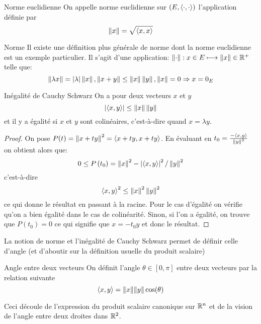\documentclass{classe}
\begin{document}
\begin{définition}{Norme euclidienne}{}
	On appelle norme euclidienne sur $(E, \left\langle \cdot, \cdot \right\rangle)$ l'application définie par
\begin{equation*}
	\left\lVert x \right\rVert = \sqrt{\left\langle x, x \right\rangle}
\end{equation*}
\end{définition}

\begin{remarque}{Norme}{}
	Il existe une définition plus générale de norme dont la norme euclidienne est un exemple particulier.
	Il s'agit d'une application: $\left\lVert \cdot \right\rVert: x \in E \longmapsto \left\lVert x \right\rVert \in \mathbb{R}^{+}$ telle que:
	\begin{equation*}
		\left\lVert \lambda x \right\rVert = \left|\lambda\right|\left\lVert x \right\rVert, \left\lVert x + y \right\rVert\leq \left\lVert x \right\rVert\left\lVert y \right\rVert, \left\lVert x \right\rVert = 0 \Rightarrow x = 0_{E}
	\end{equation*}
\end{remarque}

\begin{théorème}{Inégalité de Cauchy Schwarz}{}
On a pour deux vecteurs $x$ et $y$
\begin{equation*}
	\left|\left\langle x, y \right\rangle\right| \leq \left\lVert x \right\rVert\left\lVert y \right\rVert
\end{equation*}
et il y a égalité si $x$ et $y$ sont colinéaires, c'est-à-dire quand $x = \lambda y$.
\end{théorème}
\begin{proof}
	On pose $P(t) = \left\lVert x + ty \right\rVert^{2} = \left\langle x + ty, x + ty \right\rangle$. En évaluant en $t_{0} = \frac{-\left\langle x, y \right\rangle}{\left\lVert y \right\rVert^{2}}$ on obtient alors que:
	\begin{equation*}
		0 \leq P\left( t_{0} \right) = \left\lVert x \right\rVert^{2} - \left|\left\langle x, y \right\rangle\right|^{2}/\left\lVert y \right\rVert^{2}
	\end{equation*}
	c'est-à-dire
	\begin{equation*}
		\left\langle x, y \right\rangle^{2} \leq \left\lVert x \right\rVert^{2}\left\lVert y \right\rVert^{2}
	\end{equation*}
	ce qui donne le résultat en passant à la racine.
	Pour le cas d'égalité on vérifie qu'on a bien égalité dans le cas de colinéarité. Sinon, si l'on a égalité, on trouve que $P(t_{0}) = 0$ ce qui signifie que $x = -t_{0}y$ et donc le résultat.
\end{proof}

La notion de norme et l'inégalité de Cauchy Schwarz permet de définir celle d'angle (et d'aboutir sur la définition usuelle du produit scalaire)
\begin{définition}{Angle entre deux vecteurs}{}
On définit l'angle $\theta \in [0, \pi]$ entre deux vecteurs par la relation suivante
\begin{equation*}
	\left\langle x, y \right\rangle = \|x\|\|y\|\cos(\theta)
\end{equation*}
\end{définition}
Ceci découle de l'expression du produit scalaire canonique sur $\mathbb{R}^{n}$ et de la vision de l'angle entre deux droites dans $\mathbb{R}^{2}$.
\end{document}
